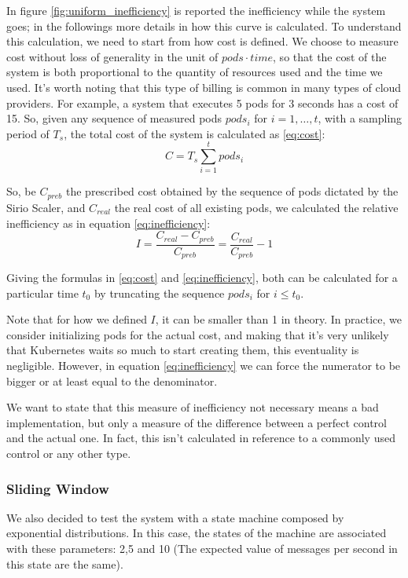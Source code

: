 In figure \ref{fig:uniform_inefficiency} is reported the inefficiency while the system goes; in the followings more details in how this curve is calculated. To understand this calculation, we need to start from how cost is defined. We choose to measure cost without loss of generality in the unit of $pods \cdot time$, so that the cost of the system is both proportional to the quantity of resources used and the time we used. It's worth noting that this type of billing is common in many types of cloud providers. For example, a system that executes 5 pods for 3 seconds has a cost of 15. So, given any sequence of measured pods $pods_i$ for $i=1,\dots,t$, with a sampling period of $T_s$, the total cost of the system is calculated as \ref{eq:cost}:
\begin{equation}
    \label{eq:cost}
    C = T_s\sum_{i=1}^{t}pods_i
\end{equation}

So, be $C_{preb}$ the prescribed cost obtained by the sequence of pods dictated by the Sirio Scaler, and $C_{real}$ the real cost of all existing pods, we calculated the relative inefficiency as in equation \ref{eq:inefficiency}:
\begin{equation}
    \label{eq:inefficiency}
    I =\frac{C_{real} - C_{preb}}{C_{preb}} = \frac{C_{real}}{C_{preb}} - 1
\end{equation}

Giving the formulas in \ref{eq:cost} and \ref{eq:inefficiency}, both can be calculated for a particular time $t_0$ by truncating the sequence $pods_i$ for $i\leq t_0$.

Note that for how we defined $I$, it can be smaller than 1 in theory. In practice, we consider initializing pods for the actual cost, and making that it's very unlikely that Kubernetes waits so much to start creating them, this eventuality is negligible. However, in equation \ref{eq:inefficiency} we can force the numerator to be bigger or at least equal to the denominator.

We want to state that this measure of inefficiency not necessary means a bad implementation, but only a measure of the difference between a perfect control and the actual one. In fact, this isn't calculated in reference to a commonly used control or any other type.

\subsubsection{Sliding Window}
We also decided to test the system with a state machine composed by exponential distributions. In this case, the states of the machine are associated with these parameters: 2,5 and 10 (The expected value of messages per second in this state are the same). 

